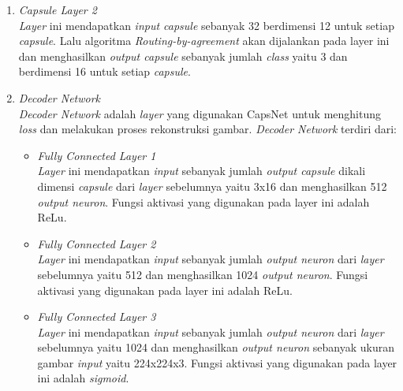 \documentclass{article}
\begin{document}
\begin{enumerate}
			\item \textit{Capsule Layer 2}\\
			\textit{Layer} ini mendapatkan \textit{input capsule} sebanyak 32 berdimensi 12 untuk setiap \textit{capsule}. Lalu algoritma \textit{Routing-by-agreement} akan dijalankan pada layer ini dan menghasilkan \textit{output capsule} sebanyak jumlah \textit{class} yaitu 3 dan berdimensi 16 untuk setiap \textit{capsule}.
			
			\item \textit{Decoder Network}\\
			\textit{Decoder Network} adalah \textit{layer} yang digunakan CapsNet untuk menghitung \textit{loss} dan melakukan proses rekonstruksi gambar. \textit{Decoder Network} terdiri dari:
			\begin{itemize}
				\item \textit{Fully Connected Layer 1}\\
				\textit{Layer} ini mendapatkan \textit{input} sebanyak jumlah \textit{output capsule} dikali dimensi \textit{capsule} dari \textit{layer} sebelumnya yaitu 3x16 dan menghasilkan 512 \textit{output neuron}. Fungsi aktivasi yang digunakan pada layer ini adalah ReLu.
				
				\item \textit{Fully Connected Layer 2}\\
				\textit{Layer} ini mendapatkan \textit{input} sebanyak jumlah \textit{output neuron} dari \textit{layer} sebelumnya yaitu 512 dan menghasilkan 1024 \textit{output neuron}. Fungsi aktivasi yang digunakan pada layer ini adalah ReLu.
				
				\item \textit{Fully Connected Layer 3}\\
				\textit{Layer} ini mendapatkan \textit{input} sebanyak jumlah \textit{output neuron} dari \textit{layer} sebelumnya yaitu 1024 dan menghasilkan \textit{output neuron} sebanyak ukuran gambar \textit{input} yaitu 224x224x3. Fungsi aktivasi yang digunakan pada layer ini adalah \textit{sigmoid}.
			\end{itemize}
			
		\end{enumerate}
\end{document}
